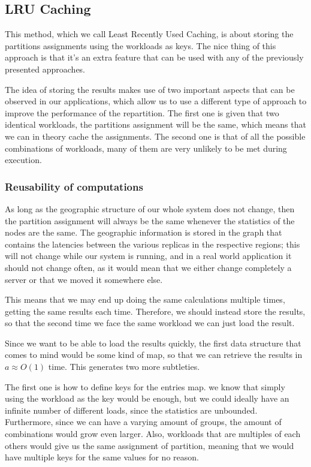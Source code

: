 \subsection{LRU Caching}\label{sec:lru-caching}
This method, which we call Least Recently Used Caching, is about storing the partitions assignments using the workloads as keys. The nice thing of this approach is that it's an extra feature that can be used with any of the previously presented approaches.

The idea of storing the results makes use of two important aspects that can be observed in our applications, which allow us to use a different type of approach to improve the performance of the repartition. The first one is given that two identical workloads, the partitions assignment will be the same, which means that we can in theory cache the assignments. The second one is that of all the possible combinations of workloads, many of them are very unlikely to be met during execution.

\subsubsection{Reusability of computations}\label{sec:Reusability-of-computations}
As long as the geographic structure of our whole system does not change, then the partition assignment will always be the same whenever the statistics of the nodes are the same. The geographic information is stored in the graph that contains the latencies between the various replicas in the respective regions; this will not change while our system is running, and in a real world application it should not change often, as it would mean that we either change completely a server or that we moved it somewhere else.

This means that we may end up doing the same calculations multiple times, getting the same results each time. Therefore, we should instead store the results, so that the second time we face the same workload we can just load the result. 

Since we want to be able to load the results quickly, the first data structure that comes to mind would be some kind of map, so that we can retrieve the results in $a\approx O(1)$ time. This generates two more subtleties.

The first one is how to define keys for the entries map. we know that simply using the workload as the key would be enough, but we could ideally have an infinite number of different loads, since the statistics are unbounded. Furthermore, since we can have a varying amount of groups, the amount of combinations would grow even larger. Also, workloads that are multiples of each others would give us the same assignment of partition, meaning that we would have multiple keys for the same values for no reason.

